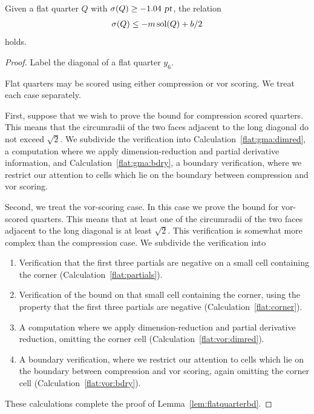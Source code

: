 \begin{lem}
\label{lem:flatquarterbd}
Given a flat quarter $Q$ with $\operatorname{\sigma}(Q) \ge -1.04 \text{ \sl pt}$, the relation
\begin{eqnarray}
\operatorname{\sigma}(Q) \le -m \operatorname{sol}(Q) + b/2  \label{rel:flatquarterbd}
\end{eqnarray}
holds.
\end{lem}

\begin{proof}
Label the diagonal of a flat
quarter $y_6$.

Flat quarters may be scored using either compression or vor
scoring.  We treat each case separately.

First, suppose that we wish to prove the bound for compression scored
quarters.  This means that the circumradii of the two faces adjacent
to the long diagonal do not exceed $\sqrt{2}$.  We subdivide the
verification into
Calculation~\ref{flat:gma:dimred},
a computation where we apply dimension-reduction
and partial derivative information, and
Calculation~\ref{flat:gma:bdry}, a boundary verification, where
we restrict our attention to cells which lie on the boundary between
compression and vor scoring.


Second, we treat the vor-scoring case.  In this case we prove the
bound for vor-scored quarters.  This means that at least one of
the circumradii of the two faces adjacent to the long diagonal
is at least $\sqrt{2}$.  This verification is somewhat more complex
than the compression case.  We subdivide the verification into
\begin{enumerate}
\item
Verification that the first three partials are negative on a
small cell containing the corner (Calculation~\ref{flat:partials}).
\item
Verification of the bound on that small cell containing the corner,
using the property that the first three partials are negative
(Calculation~\ref{flat:corner}).
\item
A computation where we apply dimension-reduction and partial
derivative reduction, omitting the corner cell
(Calculation~\ref{flat:vor:dimred}).
\item
A boundary verification, where we restrict our attention to
cells which lie on the boundary between compression and vor
scoring, again omitting the corner cell
(Calculation~\ref{flat:vor:bdry}).
\end{enumerate}

These calculations complete the proof of Lemma~\ref{lem:flatquarterbd}.
\end{proof}

